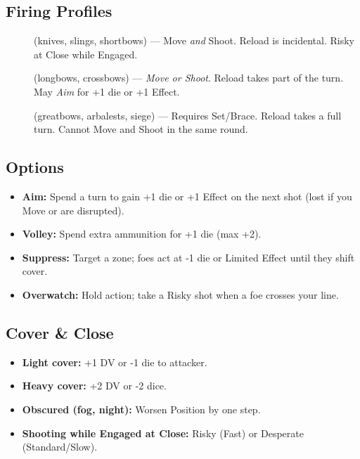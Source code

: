 \subsection{Firing Profiles}
\label{subsec:firing-profiles}
\begin{description}
  \item[] (knives, slings, shortbows) — Move \emph{and} Shoot. Reload is incidental. Risky at Close while Engaged.
  \item[] (longbows, crossbows) — \emph{Move or Shoot}. Reload takes part of the turn. May \emph{Aim} for +1 die or +1 Effect.
  \item[] (greatbows, arbalests, siege) — Requires Set/Brace. Reload takes a full turn. Cannot Move and Shoot in the same round.
\end{description}

\subsection{Options}
\label{subsec:ranged-options}
\begin{itemize}
  \item \textbf{Aim:} Spend a turn to gain +1 die or +1 Effect on the next shot (lost if you Move or are disrupted).
  \item \textbf{Volley:} Spend extra ammunition for +1 die (max +2).
  \item \textbf{Suppress:} Target a zone; foes act at -1 die or Limited Effect until they shift cover.
  \item \textbf{Overwatch:} Hold action; take a Risky shot when a foe crosses your line.
\end{itemize}

\subsection{Cover \& Close}
\label{subsec:cover-close}
\begin{itemize}
  \item \textbf{Light cover:} +1 DV or -1 die to attacker.
  \item \textbf{Heavy cover:} +2 DV or -2 dice.
  \item \textbf{Obscured (fog, night):} Worsen Position by one step.
  \item \textbf{Shooting while Engaged at Close:} Risky (Fast) or Desperate (Standard/Slow).
\end{itemize}


